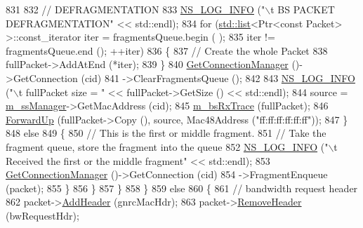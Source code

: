 \begin{DoxyCode}
831 
832                   \textcolor{comment}{// DEFRAGMENTATION}
833                   \hyperlink{group__logging_gafbd73ee2cf9f26b319f49086d8e860fb}{NS\_LOG\_INFO} (\textcolor{stringliteral}{"\(\backslash\)t BS PACKET DEFRAGMENTATION"} << std::endl);
834                   \textcolor{keywordflow}{for} (\hyperlink{openflow-interface_8h_afd9bcfa176617760671b67580f536fa7}{std::list}<Ptr<const Packet> >::const\_iterator iter = fragmentsQueue.begin (
      );
835                        iter != fragmentsQueue.end (); ++iter)
836                     \{
837                       \textcolor{comment}{// Create the whole Packet}
838                       fullPacket->AddAtEnd (*iter);
839                     \}
840                   \hyperlink{classns3_1_1WimaxNetDevice_a25450b18f62f91e4c2ab08485bd171a2}{GetConnectionManager} ()->GetConnection (cid)
841                   ->ClearFragmentsQueue ();
842 
843                   \hyperlink{group__logging_gafbd73ee2cf9f26b319f49086d8e860fb}{NS\_LOG\_INFO} (\textcolor{stringliteral}{"\(\backslash\)t fullPacket size = "} << fullPacket->GetSize () << std::endl);
844                   source = \hyperlink{classns3_1_1BaseStationNetDevice_a2365fd053319dda930081e661e6381a6}{m\_ssManager}->GetMacAddress (cid);
845                   \hyperlink{classns3_1_1BaseStationNetDevice_aff889426b2009f26312b689ac4015a8d}{m\_bsRxTrace} (fullPacket);
846                   \hyperlink{classns3_1_1WimaxNetDevice_ae6d708e65981c36d43f075527b11eb8d}{ForwardUp} (fullPacket->Copy (), source, Mac48Address (\textcolor{stringliteral}{"ff:ff:ff:ff:ff:ff"}));
847                 \}
848               \textcolor{keywordflow}{else}
849                 \{
850                   \textcolor{comment}{// This is the first or middle fragment.}
851                   \textcolor{comment}{// Take the fragment queue, store the fragment into the queue}
852                   \hyperlink{group__logging_gafbd73ee2cf9f26b319f49086d8e860fb}{NS\_LOG\_INFO} (\textcolor{stringliteral}{"\(\backslash\)t Received the first or the middle fragment"} << std::endl);
853                   \hyperlink{classns3_1_1WimaxNetDevice_a25450b18f62f91e4c2ab08485bd171a2}{GetConnectionManager} ()->GetConnection (cid)
854                   ->FragmentEnqueue (packet);
855                 \}
856             \}
857         \}
858     \}
859   \textcolor{keywordflow}{else}
860     \{
861       \textcolor{comment}{// bandwidth request header}
862       packet->\hyperlink{classns3_1_1Packet_a465108c595a0bc592095cbcab1832ed8}{AddHeader} (gnrcMacHdr);
863       packet->\hyperlink{classns3_1_1Packet_a0961eccf975d75f902d40956c93ba63e}{RemoveHeader} (bwRequestHdr);

\end{DoxyCode}

